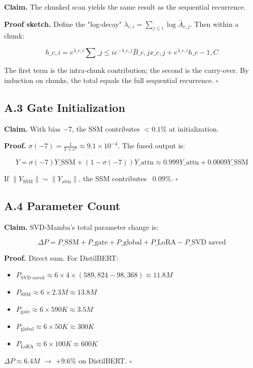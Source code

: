 \textbf{Claim.} The chunked scan yields the same result as the sequential 
recurrence.

\textbf{Proof sketch.} Define the "log-decay" $\lambda_{c, i} = \sum_{j \leq i} \log \bar{A}_{c, j}$. 
Then within a chunk:

\[
h\_{c, i} = e^{\lambda\_{c, i}} \sum\_{j \leq i} e^{-\lambda\_{c, j}} \bar{B}\_{c, j} x\_{c, j} + e^{\lambda\_{c, i}} h\_{c-1, C}
\]

The first term is the intra-chunk contribution; the second is the carry-over. 
By induction on chunks, the total equals the full sequential recurrence. $\square$

\subsection{A.3 Gate Initialization}

\textbf{Claim.} With bias $-7$, the SSM contributes $< 0.1\%$ at initialization.

\textbf{Proof.} $\sigma(-7) = \frac{1}{1 + e^7} \approx 9.1 \times 10^{-4}$. The 
fused output is:

\[
Y = \sigma(-7) Y\_\text{SSM} + (1 - \sigma(-7)) Y\_\text{attn} \approx 0.999 Y\_\text{attn} + 0.0009 Y\_\text{SSM}
\]

If $\|Y_\text{SSM}\| \sim \|Y_\text{attn}\|$, the SSM contributes ~0.09\%. $\square$

\subsection{A.4 Parameter Count}

\textbf{Claim.} SVD-Mamba's total parameter change is:

\[
\Delta P = P\_\text{SSM} + P\_\text{gate} + P\_\text{global} + P\_\text{LoRA} - P\_\text{SVD saved}
\tag{A.2}
\]

\textbf{Proof.} Direct sum. For DistilBERT:

\begin{itemize}
\item $P_\text{SVD saved} \approx 6 \times 4 \times (589,824 - 98,368) \approx 11.8M$
\item $P_\text{SSM} \approx 6 \times 2.3M \approx 13.8M$
\item $P_\text{gate} \approx 6 \times 590K \approx 3.5M$
\item $P_\text{global} \approx 6 \times 50K \approx 300K$
\item $P_\text{LoRA} \approx 6 \times 100K \approx 600K$

\end{itemize}
$\Delta P \approx 6.4M$ $\to$ +9.6\% on DistilBERT. $\square$

